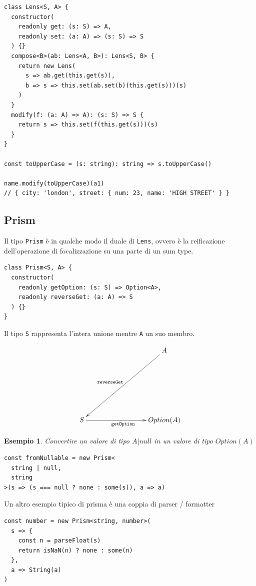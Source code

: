 \documentclass[12pt]{article}
\newtheorem{example}{Esempio}
\begin{document}
\begin{verbatim}
class Lens<S, A> {
  constructor(
    readonly get: (s: S) => A,
    readonly set: (a: A) => (s: S) => S
  ) {}
  compose<B>(ab: Lens<A, B>): Lens<S, B> {
    return new Lens(
      s => ab.get(this.get(s)),
      b => s => this.set(ab.set(b)(this.get(s)))(s)
    )
  }
  modify(f: (a: A) => A): (s: S) => S {
    return s => this.set(f(this.get(s)))(s)
  }
}

const toUpperCase = (s: string): string => s.toUpperCase()

name.modify(toUpperCase)(a1)
// { city: 'london', street: { num: 23, name: 'HIGH STREET' } }
\end{verbatim}

\subsection{Prism}

Il tipo \texttt{Prism} è in qualche modo il duale di \texttt{Lens}, ovvero è la reificazione dell'operazione di focalizzazione
su una parte di un sum type.

\begin{verbatim}
class Prism<S, A> {
  constructor(
    readonly getOption: (s: S) => Option<A>,
    readonly reverseGet: (a: A) => S
  ) {}
}
\end{verbatim}

Il tipo \texttt{S} rappresenta l'intera unione mentre \texttt{A} un suo membro.

\[
\xymatrixrowsep{3cm}
\xymatrixcolsep{3cm}
\xymatrix{
  & A \ar[dl]_{\texttt{reverseGet}} \\
  S \ar[r]_{\texttt{getOption}} & {Option(A)}
}
\]

\begin{example}
Convertire un valore di tipo $A | null$ in un valore di tipo $Option(A)$

\begin{verbatim}
const fromNullable = new Prism<
  string | null,
  string
>(s => (s === null ? none : some(s)), a => a)
\end{verbatim}

\end{example}

Un altro esempio tipico di prisma è una coppia di parser / formatter

\begin{verbatim}
const number = new Prism<string, number>(
  s => {
    const n = parseFloat(s)
    return isNaN(n) ? none : some(n)
  },
  a => String(a)
)
\end{verbatim}
\end{document}
